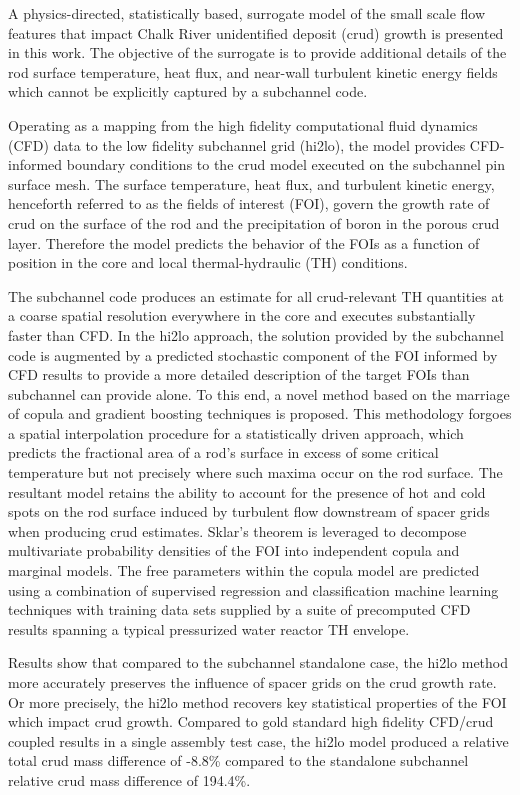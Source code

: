 
\utabstract
{}%
\indent
A physics-directed, statistically based,
surrogate model of the small scale flow features that impact Chalk River unidentified deposit (crud) growth is presented in this work. 
The objective of the surrogate is to provide additional details of the rod surface temperature, heat
flux, and near-wall turbulent kinetic energy fields which cannot be explicitly captured by a subchannel code. 

Operating as a mapping from the high fidelity computational fluid dynamics (CFD) data to the low fidelity subchannel grid (hi2lo), the model provides CFD-informed boundary conditions to the crud model executed on the subchannel pin surface mesh. The surface temperature, heat
flux, and turbulent kinetic energy, henceforth referred to as the fields of interest (FOI),
govern the growth rate of crud on the surface of the rod and the
precipitation of boron in the porous crud layer. Therefore the model predicts the behavior of the
FOIs as a function of position in the core and local thermal-hydraulic (TH) conditions.

The subchannel code produces an estimate for all crud-relevant TH quantities at a coarse spatial resolution everywhere in
the core and executes substantially faster than CFD.  In the hi2lo approach, the solution provided by the subchannel code is augmented by a predicted stochastic
component of the FOI informed by CFD results to provide a more detailed description of the target
FOIs than subchannel can provide alone.  To this end, a novel method based on the marriage of copula and
gradient boosting techniques is proposed. This methodology forgoes a spatial interpolation procedure
for a statistically driven approach, which predicts the fractional area of a rod’s surface in excess of some
critical temperature but not precisely where such maxima occur on the rod surface.
The resultant model retains the ability to account for the presence
of hot and cold spots on the rod surface induced by turbulent flow downstream of spacer grids when
producing crud estimates. Sklar’s theorem is leveraged to decompose multivariate probability densities
of the FOI into independent copula and marginal models. The free parameters within the copula model
are predicted using a combination of supervised regression and classification machine learning techniques
with training data sets supplied by a suite of precomputed CFD results spanning a typical pressurized water reactor TH
envelope.

Results show that compared to the subchannel standalone case, the hi2lo method more accurately preserves the influence of spacer grids on the crud growth rate.  Or more precisely, the hi2lo method recovers key statistical properties of the FOI which impact crud growth.  Compared to gold standard high fidelity CFD/crud coupled results in a single assembly test case, the hi2lo model produced a relative total crud mass difference of -8.8\% compared to the standalone subchannel relative crud mass difference of 194.4\%.
